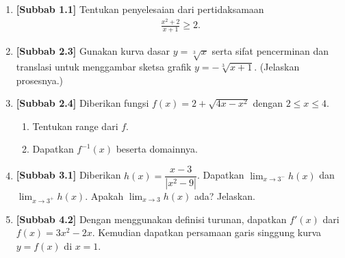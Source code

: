 \documentclass[10pt,openany,a4paper]{article}
\theoremstyle{definition}
\theoremstyle{definition}
\theoremstyle{plain}
\begin{document}
\newpage

\begin{enumerate}
    \item \textbf{[Subbab 1.1]} Tentukan penyelesaian dari pertidaksamaan
    \begin{align*}
        \frac{x^2+2}{x+1}\geq 2.
    \end{align*}

    \item \textbf{[Subbab 2.3]} Gunakan kurva dasar $y=\sqrt[3]{x}$ serta sifat pencerminan dan translasi untuk menggambar sketsa grafik $y=-\sqrt[3]{x+1}$. (Jelaskan prosesnya.)

    \item \textbf{[Subbab 2.4]} Diberikan fungsi $f(x)=2+\sqrt{4x-x^2}$ dengan $2\leq x\leq 4$.
    \begin{enumerate}
        \item Tentukan range dari $f$.
        \item Dapatkan $f^{-1}(x)$ beserta domainnya.
    \end{enumerate}

    \item \textbf{[Subbab 3.1]} Diberikan $h(x)=\dfrac{x-3}{|x^2-9|}$. Dapatkan $\displaystyle\lim_{x\to 3^-}h(x)$ dan $\displaystyle\lim_{x\to 3^+}h(x)$. Apakah $\displaystyle\lim_{x\to 3}h(x)$ ada? Jelaskan.

    \item \textbf{[Subbab 4.2]} Dengan menggunakan definisi turunan, dapatkan $f'(x)$ dari $f(x)=3x^2-2x$. Kemudian dapatkan persamaan garis singgung kurva $y=f(x)$ di $x=1$.
\end{enumerate}

\newpage
\end{document}
